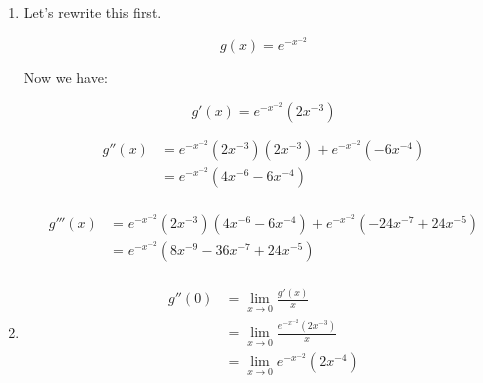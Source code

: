 \documentclass[12pt,letterpaper]{article}
\begin{document}
\begin{enumerate}
\begin{enumerate}
\begin{proof}
            $\envert{E_m(x)} \leq \frac{1}{M + 1}2^{M + 1} < \epsilon$.

            So $S_N(x)$ converges uniformly to $\sin(x)$ on $\intcc{-2, 2}$.
          \end{proof}

          We can generalize this proof to any interval $\intcc{-R, R}$ by substituting $R$ for $2$.

          \begin{proof}

            For any $\epsilon > 0$,

            choose $M \in \mathbb{N}$ such that $\frac{1}{M + 1}R^{M + 1} < \epsilon$.

            Then we have, for any $m \geq M$ and for all $x \in \intcc{-R, R}$,

            $\envert{E_m(x)} \leq \frac{1}{M + 1}R^{M + 1} < \epsilon$.

            So $S_N(x)$ converges uniformly to $\sin(x)$ on $\intcc{-R, R}$.
          \end{proof}
        \setcounter{enumii}{9}
        \item
          Let's rewrite this first.

          \[g(x) = e^{-x^{-2}}\]

          Now we have:

          \[g'(x) = e^{-x^{-2}}\left(2x^{-3}\right)\]

          \begin{align*}
            g''(x) &= e^{-x^{-2}}\left(2x^{-3}\right)\left(2x^{-3}\right) + e^{-x^{-2}}\left(-6x^{-4}\right) \\
            &= e^{-x^{-2}}\left(4x^{-6}-6x^{-4}\right) \\
          \end{align*}

          \begin{align*}
            g'''(x) &= e^{-x^{-2}}\left(2x^{-3}\right)\left(4x^{-6}-6x^{-4}\right) + e^{-x^{-2}}\left(-24x^{-7}+24x^{-5}\right) \\
            &= e^{-x^{-2}}\left(8x^{-9}-36x^{-7}+24x^{-5}\right) \\
          \end{align*}
        \item
          \begin{align*}
            g''(0) &= \lim_{x \to 0} \frac{g'(x)}{x} \\
            &= \lim_{x \to 0} \frac{e^{-x^{-2}}\left(2x^{-3}\right)}{x} \\
            &= \lim_{x \to 0} e^{-x^{-2}}\left(2x^{-4}\right) \\
          \end{align*}
      \end{enumerate}
  \end{enumerate}
\end{document}
